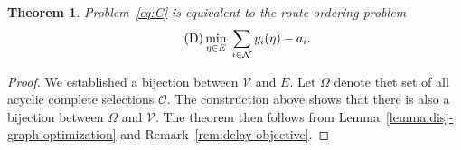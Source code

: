 \documentclass[a4paper]{report}
\theoremstyle{definition}
\newtheorem{define}{Definition}[chapter]
\theoremstyle{plain}
\newtheorem{theorem}{Theorem}[chapter]
\begin{document}
\begin{theorem}
  Problem~\eqref{eq:C} is equivalent to the \emph{route ordering problem}
  \begin{align}\label{eq:D}
    \tag{$\mathrm{D}$}
    \min_{\eta \in E} \; \sum_{i \in \mathcal{N}} y_i(\eta) - a_i .
  \end{align}
\end{theorem}
\begin{proof}
  We established a bijection between $\mathcal{V}$ and $E$. Let $\Omega$ denote thet
  set of all acyclic complete selections $\mathcal{O}$. The construction above
  shows that there is also a bijection between $\Omega$ and $\mathcal{V}$.
  The theorem then follows from Lemma~\ref{lemma:disj-graph-optimization} and Remark~\ref{rem:delay-objective}.
\end{proof}




\end{document}
